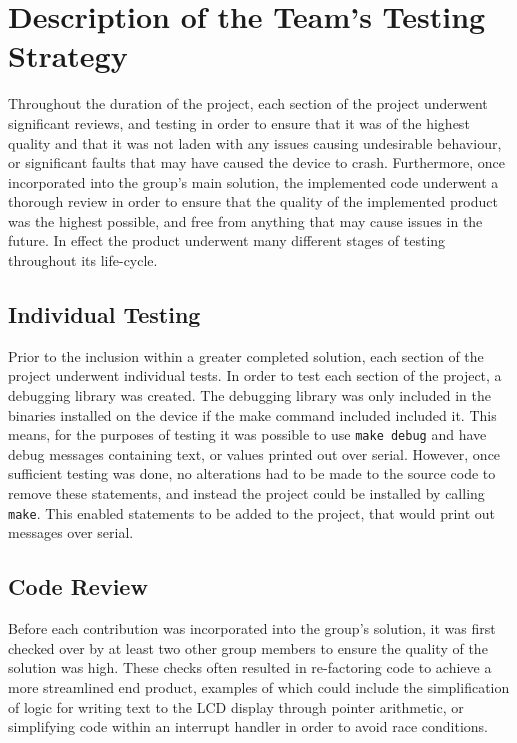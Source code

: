 \section{Description of the Team's Testing Strategy}

Throughout the duration of the project, each section of the project underwent 
significant reviews, and testing in order to ensure that it was of the highest 
quality and that it was not laden with any issues causing undesirable behaviour, 
or significant faults that may have caused the device to crash. Furthermore, once 
incorporated into the group's main solution, the implemented code underwent a 
thorough review in order to ensure that the quality of the implemented product 
was the highest possible, and free from anything that may cause issues in the 
future. In effect the product underwent many different stages of testing 
throughout its life-cycle. 

\subsection*{Individual Testing}

Prior to the inclusion within a greater completed solution, each section of the 
project underwent individual tests. In order to test each section of the project, 
a debugging library was created. The debugging library was only included in the 
binaries installed on the device if the make command included included it. This 
means, for the purposes of testing it was possible to use \texttt{make debug} 
and have debug messages containing text, or values printed out over serial. 
However, once sufficient testing was done, no 
alterations had to be made to the source code to remove these statements, and 
instead the project could be installed by calling \texttt{make}. 
This enabled statements to be added to the project, that would print out 
messages over serial.

\subsection*{Code Review}

Before each contribution was incorporated into the group's solution, it was 
first checked over by at least two other group members to ensure the quality of 
the solution was high. These checks often resulted in re-factoring code to 
achieve a more streamlined end product, examples of which could include the 
simplification of logic for writing text to the LCD display through pointer 
arithmetic, or simplifying code within an interrupt handler in order to avoid 
race conditions. 

